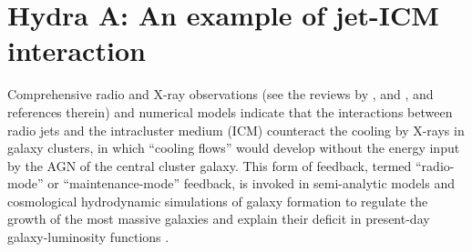 




  

\section{Hydra A: An example of jet-ICM interaction}\label{int:hyd}
Comprehensive radio and X-ray observations (see the reviews by \citealt{mcnamara07, mcnamara12}, and \citealt{fabian12}, and references therein) and numerical models \citep{gaspari11, dubois10} indicate that the interactions between radio jets and the intracluster medium (ICM) counteract the cooling by X-rays in galaxy clusters, in which ``cooling flows'' would develop without the energy input by the AGN of the central cluster galaxy. This form of feedback, termed ``radio-mode'' or ``maintenance-mode'' feedback, is invoked in semi-analytic models and cosmological hydrodynamic simulations of galaxy formation to regulate the growth of the most massive galaxies and explain their deficit in present-day galaxy-luminosity functions \citep{croton06, okamoto2008b, dubois13}. 

